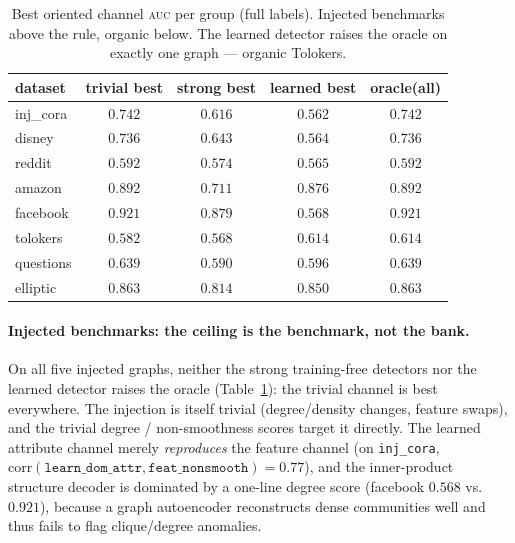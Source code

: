 \documentclass[11pt]{article}
\newcommand{\auc}{\textsc{auc}}
\begin{document}
\begin{table}[t]
\centering
\caption{Best oriented channel \auc{} per group (full labels). Injected benchmarks above the
rule, organic below. The learned detector raises the oracle on exactly one graph --- organic
Tolokers.}
\label{tab:bank}
\begin{tabular}{lcccc}
\toprule
dataset & trivial best & strong best & learned best & oracle(all) \\
\midrule
inj\_cora & $\mathbf{0.742}$ & $0.616$ & $0.562$ & $0.742$ \\
disney   & $\mathbf{0.736}$ & $0.643$ & $0.564$ & $0.736$ \\
reddit   & $\mathbf{0.592}$ & $0.574$ & $0.565$ & $0.592$ \\
amazon   & $\mathbf{0.892}$ & $0.711$ & $0.876$ & $0.892$ \\
facebook & $\mathbf{0.921}$ & $0.879$ & $0.568$ & $0.921$ \\
\midrule
tolokers & $0.582$ & $0.568$ & $\mathbf{0.614}$ & $\mathbf{0.614}$ \\
questions & $\mathbf{0.639}$ & $0.590$ & $0.596$ & $0.639$ \\
elliptic & $\mathbf{0.863}$ & $0.814$ & $0.850$ & $0.863$ \\
\bottomrule
\end{tabular}
\end{table}

\paragraph{Injected benchmarks: the ceiling is the benchmark, not the bank.} On all five
injected graphs, neither the strong training-free detectors nor the learned detector raises the
oracle (Table~\ref{tab:bank}): the trivial channel is best everywhere. The injection is itself
trivial (degree/density changes, feature swaps), and the trivial degree / non-smoothness scores
target it directly. The learned attribute channel merely \emph{reproduces} the feature channel
(on \texttt{inj\_cora}, $\mathrm{corr}(\texttt{learn\_dom\_attr}, \texttt{feat\_nonsmooth})
{=}0.77$), and the inner-product structure decoder is dominated by a one-line degree score
(facebook $0.568$ vs.\ $0.921$), because a graph autoencoder reconstructs dense communities
well and thus fails to flag clique/degree anomalies.
\end{document}
